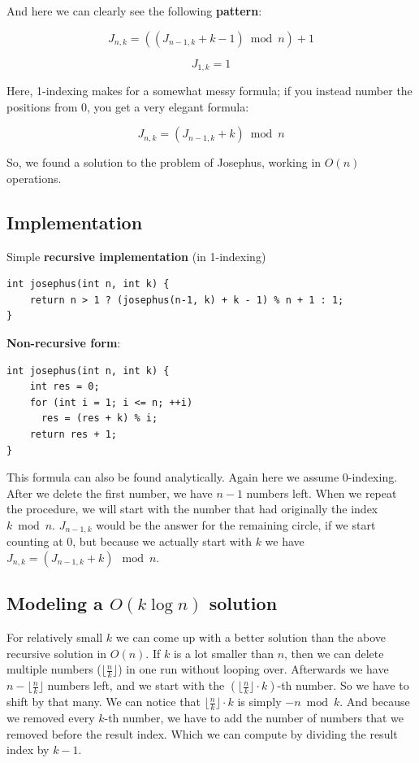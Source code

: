 And here we can clearly see the following \textbf{pattern}:

$$J_{n,k} = \left( (J_{n-1,k} + k - 1) \bmod n \right) + 1$$

$$J_{1,k} = 1$$

Here, 1-indexing makes for a somewhat messy formula; if you instead number the positions from 0, you get a very elegant formula:

$$J_{n,k} = (J_{n-1,k} + k) \bmod n$$

So, we found a solution to the problem of Josephus, working in $O(n)$ operations.

\subsection{Implementation}

Simple \textbf{recursive implementation} (in 1-indexing)

\begin{verbatim}
int josephus(int n, int k) {
    return n > 1 ? (josephus(n-1, k) + k - 1) % n + 1 : 1;
}
\end{verbatim}

\textbf{Non-recursive form}:

\begin{verbatim}
int josephus(int n, int k) {
    int res = 0;
    for (int i = 1; i <= n; ++i)
  	  res = (res + k) % i;
    return res + 1;
}
\end{verbatim}

This formula can also be found analytically.
Again here we assume 0-indexing.
After we delete the first number, we have $n-1$ numbers left.
When we repeat the procedure, we will start with the number that had originally the index $k \bmod n$.
$J_{n-1, k}$ would be the answer for the remaining circle, if we start counting at $0$, but because we actually start with $k$ we have $J_{n, k} = (J_{n-1,k} + k) \ \bmod n$.

\subsection{Modeling a $O(k \log n)$ solution}

For relatively small $k$ we can come up with a better solution than the above recursive solution in $O(n)$.
If $k$ is a lot smaller than $n$, then we can delete multiple numbers ($\lfloor \frac{n}{k} \rfloor$) in one run without looping over.
Afterwards we have $n - \lfloor \frac{n}{k} \rfloor$ numbers left, and we start with the $(\lfloor \frac{n}{k} \rfloor \cdot k)$-th number.
So we have to shift by that many.
We can notice that $\lfloor \frac{n}{k} \rfloor \cdot k$ is simply $-n \bmod k$.
And because we removed every $k$-th number, we have to add the number of numbers that we removed before the result index.
Which we can compute by dividing the result index by $k - 1$.

